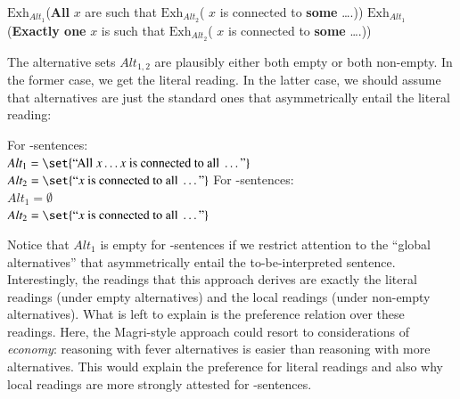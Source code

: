 \documentclass[fleqn,reqno,10pt]{article}
\newcommand{\as}{\acro{as}}
\renewcommand{\es}{\acro{es}}
\newcommand{\exh}{\ensuremath{\mathrm{Exh}}}
\renewcommand{\mymark}[1]{\textbf{#1}}
\begin{document}
\begin{exe}
  \ex \label{Magri-Parses}
    \begin{xlist}
    \ex \label{Magri-Parse-AS} \mymark{$\exh_{Alt_1}$}(\mymark{All} $x$ are such that \mymark{$\exh_{Alt_2}$}( $x$ is connected to
      \mymark{some}  \dots.))
    \ex \label{Magri-Parse-ES} \mymark{$\exh_{Alt_1}$}(\mymark{Exactly
        one} $x$  is such that \mymark{$\exh_{Alt_2}$}( $x$ is connected to \mymark{some}  \dots.))
    \end{xlist}
\end{exe}

\noindent The alternative sets $Alt_{1,2}$ are plausibly either both
empty or both non-empty. In the former case, we get the literal
reading. In the latter case, we should assume that alternatives are
just the standard ones that asymmetrically entail the literal reading:

\begin{exe}
  \ex \label{Magri-Alternatives} 
    \begin{xlist}
    \ex \label{Magri-Alternatives-AS} For \as-sentences: \\
      $Alt_1 = \set{\text{``All } x
          \dots x \text{ is connected to all } \dots \text{''}}$ \\
        $Alt_2 = \set{\text{``}x \text{ is connected to all } \dots
          \text{''}}$
    \ex \label{Magri-Alternatives-AS} For \es-sentences: \\
      $Alt_1 = \emptyset$ \\
        $Alt_2 = \set{\text{``}x \text{ is connected to all } \dots \text{''}}$
    \end{xlist}
\end{exe}  

\noindent Notice that $Alt_1$ is empty for \es-sentences if we
restrict attention to the ``global alternatives'' that asymmetrically
entail the to-be-interpreted sentence. Interestingly, the readings
that this approach derives are exactly the literal readings (under
empty alternatives) and the local readings (under non-empty
alternatives). What is left to explain is the preference relation over
these readings. Here, the Magri-style approach could resort to
considerations of \emph{economy}: reasoning with fever alternatives is
easier than reasoning with more alternatives. This would explain the
preference for literal readings and also why local readings are more
strongly attested for \es-sentences.
\end{document}
